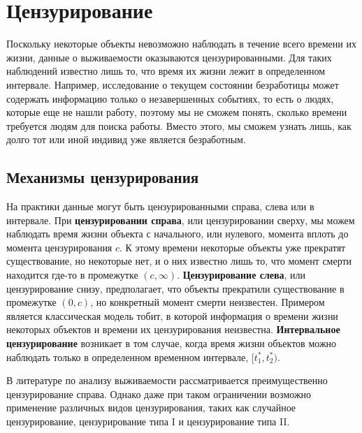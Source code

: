 \section{Цензурирование}\label{sec:17.4}

\noindent
Поскольку некоторые объекты невозможно наблюдать в течение всего времени их жизни, данные о выживаемости оказываются цензурированными. Для таких наблюдений известно лишь то, что время их жизни лежит в определенном интервале. Например, исследование о текущем состоянии безработицы может содержать информацию только о незавершенных событиях, то есть о людях, которые еще не нашли работу, поэтому мы не сможем понять, сколько времени требуется людям для поиска работы. Вместо этого, мы сможем узнать лишь, как долго тот или иной индивид уже является безработным.


\subsection{Механизмы цензурирования}\label{sec:17.4.1}

\noindent
На практики данные могут быть цензурированными справа, слева или в интервале. При \textbf{цензурировании справа}, или цензурировании сверху, мы можем наблюдать время жизни объекта с начального, или нулевого, момента вплоть до момента цензурирования $c$. К этому времени некоторые объекты уже прекратят существование, но некоторые нет, и о них известно лишь то, что момент смерти находится где-то в промежутке $(c,\infty)$. \textbf{Цензурирование слева}, или цензурирование снизу, предполагает, что объекты прекратили существование в промежутке $(0,c)$, но конкретный момент смерти неизвестен. Примером является классическая модель тобит, в которой информация о времени жизни некоторых объектов и времени их цензурирования неизвестна. \textbf{Интервальное цензурирование} возникает в том случае, когда время жизни объектов можно наблюдать только в определенном временном интервале, $[t^*_1,t^*_2)$.

В литературе по анализу выживаемости рассматривается преимущественно цензурирование справа. Однако даже при таком ограничении возможно применение различных видов цензурирования, таких как случайное цензурирование, цензурирование типа I и цензурирование типа II. %

